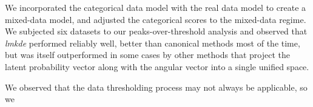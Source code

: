 We incorporated the categorical data model with the real data model to create a 
    mixed-data model, and adjusted the categorical scores to the mixed-data 
    regime.  We subjected six datasets to our peaks-over-threshold analysis and 
    observed that \emph{lmkde} performed reliably well, better than canonical 
    methods most of the time, but was itself outperformed in some cases by other 
    methods that project the latent probability vector along with the angular 
    vector into a single unified space.

We observed that the data thresholding process may not always be applicable, so 
    we 
    
